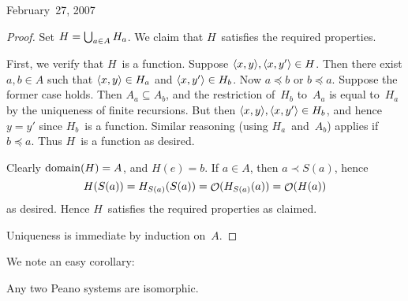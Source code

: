 \begin{lecture}{February~27, 2007}
\begin{proof}
Set \(H=\bigcup_{a\in A}H_a\). We claim that \(H\)~satisfies the required properties.

First, we verify that \(H\)~is a function. Suppose \(\langle{x},{y}\rangle,\langle{x},{y'}\rangle\in H\). Then there exist \(a,b\in A\) such that \(\langle{x},{y}\rangle\in H_a\) and \(\langle{x},{y'}\rangle\in H_b\). Now \(a\preceq b\) or \(b\preceq a\). Suppose the former case holds. Then \(A_a\subseteq A_b\), and the restriction of~\(H_b\) to~\(A_a\) is equal to~\(H_a\) by the uniqueness of finite recursions. But then \(\langle{x},{y}\rangle,\langle{x},{y'}\rangle\in H_b\), and hence \(y=y'\) since \(H_b\)~is a function. Similar reasoning (using \(H_a\)~and~\(A_b\)) applies if \(b\preceq a\). Thus \(H\)~is a function as desired.

Clearly \(\operatorname{domain}(H)=A\), and \(H(e)=b\). If \(a\in A\), then \(a\prec S(a)\), hence
\[H(S(a))=H_{S(a)}(S(a))=\mathop{\mathcal{O}}\nolimits(H_{S(a)}(a))=\mathop{\mathcal{O}}\nolimits(H(a))\]
as desired. Hence \(H\)~satisfies the required properties as claimed.

Uniqueness is immediate by induction on~\(A\).
\end{proof}
\noindent We note an easy corollary:
\begin{cor}
Any two Peano systems are isomorphic.
\end{cor}
\end{lecture}
